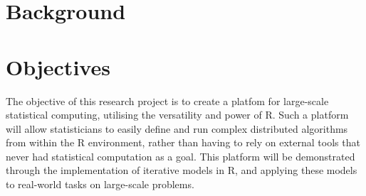 \documentclass[a4paper,10pt]{article}
\begin{document}

\tableofcontents
\newpage
\section{Background}



\section{Objectives}

 The objective of this research project is to create a platfom for large-scale
 statistical computing, utilising the versatility and power of R.
 Such a platform will allow statisticians to easily define and run complex
 distributed algorithms from within the R environment, rather than having to
 rely on external tools that never had statistical computation as a goal.
 This platform will be demonstrated through the implementation of iterative
 models in R, and applying these models to real-world tasks on large-scale
 problems.
\end{document}
